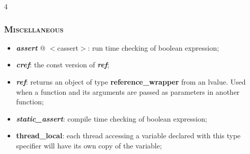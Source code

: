 \documentclass[10pt]{article}
\begin{document}
\begin{multicols*}{4}
{{\subsubsection*{\textsc{Miscellaneous}} 
\begin{itemize}[leftmargin=*,topsep=0.25pt]
  \setlength\itemsep{-1.8pt}
\item  \emph{\textbf{assert}} @ $<$cassert$>$: run time checking of boolean expression; 
\item  \emph{\textbf{cref}}: the const version of \emph{\textbf{ref}};
\item  \emph{\textbf{ref}}: returns an object of type \textbf{reference\_wrapper} from an lvalue. Used when a function and its arguments are passed as parameters in another function;
\item  \emph{\textbf{static\_assert}}: compile time checking of boolean expression;
\item  {\textbf{thread\_local}}: each thread accessing a variable declared with this type specifier will have its  own copy of the variable; 
\end{itemize}

}

}

 

\end{multicols*}
\end{document}

